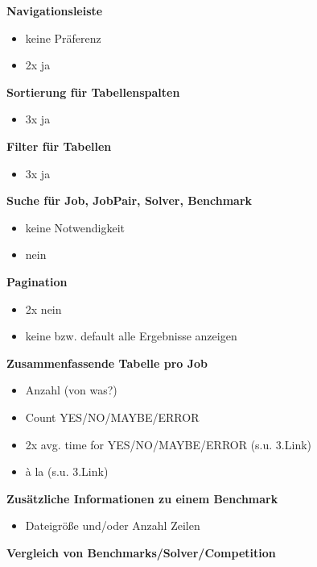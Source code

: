 \textbf{Navigationsleiste}

\begin{itemize}
\tightlist
\item
  keine Präferenz
\item
  2x ja
\end{itemize}

\textbf{Sortierung für Tabellenspalten}

\begin{itemize}
\tightlist
\item
  3x ja
\end{itemize}

\textbf{Filter für Tabellen}

\begin{itemize}
\tightlist
\item
  3x ja
\end{itemize}

\textbf{Suche für Job, JobPair, Solver, Benchmark}

\begin{itemize}
\tightlist
\item
  keine Notwendigkeit
\item
  nein
\end{itemize}

\textbf{Pagination}

\begin{itemize}
\tightlist
\item
  2x nein
\item
  keine bzw. default alle Ergebnisse anzeigen
\end{itemize}

\textbf{Zusammenfassende Tabelle pro Job}

\begin{itemize}
\tightlist
\item
  Anzahl (von was?)
\item
  Count YES/NO/MAYBE/ERROR
\item
  2x avg. time for YES/NO/MAYBE/ERROR (s.u. 3.Link)
\item
  à la (s.u. 3.Link)
\end{itemize}

\textbf{Zusätzliche Informationen zu einem Benchmark}

\begin{itemize}
\tightlist
\item
  Dateigröße und/oder Anzahl Zeilen
\end{itemize}

\textbf{Vergleich von Benchmarks/Solver/Competition}

